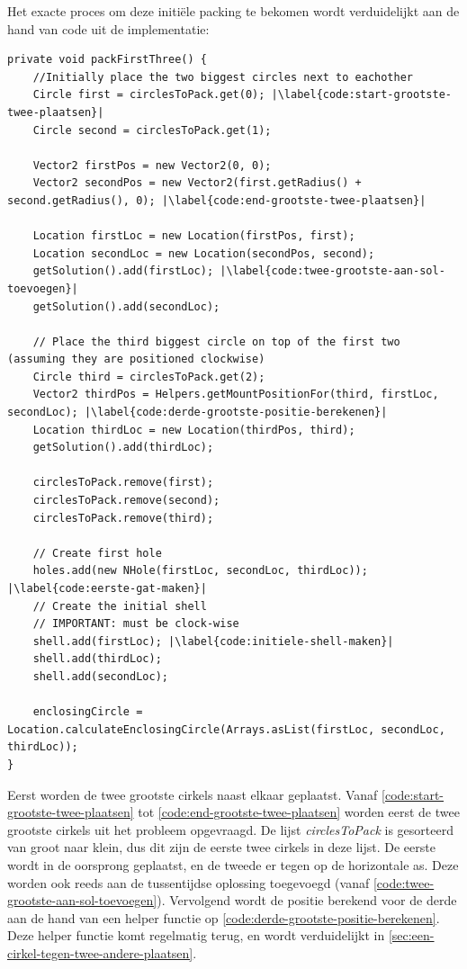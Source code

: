 \documentclass[12pt,a4paper,oneside]{book}
\begin{document}
Het exacte proces om deze initiële packing te bekomen wordt verduidelijkt aan de hand van code uit de implementatie:

\begin{lstlisting}
private void packFirstThree() {
	//Initially place the two biggest circles next to eachother
	Circle first = circlesToPack.get(0); |\label{code:start-grootste-twee-plaatsen}|
	Circle second = circlesToPack.get(1);

	Vector2 firstPos = new Vector2(0, 0);
	Vector2 secondPos = new Vector2(first.getRadius() + second.getRadius(), 0); |\label{code:end-grootste-twee-plaatsen}|

	Location firstLoc = new Location(firstPos, first);
	Location secondLoc = new Location(secondPos, second);
	getSolution().add(firstLoc); |\label{code:twee-grootste-aan-sol-toevoegen}|
	getSolution().add(secondLoc);

	// Place the third biggest circle on top of the first two (assuming they are positioned clockwise)
	Circle third = circlesToPack.get(2);
	Vector2 thirdPos = Helpers.getMountPositionFor(third, firstLoc, secondLoc); |\label{code:derde-grootste-positie-berekenen}|
	Location thirdLoc = new Location(thirdPos, third);
	getSolution().add(thirdLoc);

	circlesToPack.remove(first);
	circlesToPack.remove(second);
	circlesToPack.remove(third);

	// Create first hole
	holes.add(new NHole(firstLoc, secondLoc, thirdLoc)); |\label{code:eerste-gat-maken}|
	// Create the initial shell
	// IMPORTANT: must be clock-wise
	shell.add(firstLoc); |\label{code:initiele-shell-maken}|
	shell.add(thirdLoc);
	shell.add(secondLoc);

	enclosingCircle = Location.calculateEnclosingCircle(Arrays.asList(firstLoc, secondLoc, thirdLoc));
}
\end{lstlisting}

Eerst worden de twee grootste cirkels naast elkaar geplaatst.
Vanaf \autoref{code:start-grootste-twee-plaatsen} tot \autoref{code:end-grootste-twee-plaatsen} worden eerst de twee grootste cirkels uit het probleem opgevraagd.
De lijst \textit{circlesToPack} is gesorteerd van groot naar klein, dus dit zijn de eerste twee cirkels in deze lijst.
De eerste wordt in de oorsprong geplaatst, en de tweede er tegen op de horizontale as.
Deze worden ook reeds aan de tussentijdse oplossing toegevoegd (vanaf \autoref{code:twee-grootste-aan-sol-toevoegen}).
Vervolgend wordt de positie berekend voor de derde aan de hand van een helper functie op \autoref{code:derde-grootste-positie-berekenen}.
Deze helper functie komt regelmatig terug, en wordt verduidelijkt in \autoref{sec:een-cirkel-tegen-twee-andere-plaatsen}.
\end{document}
